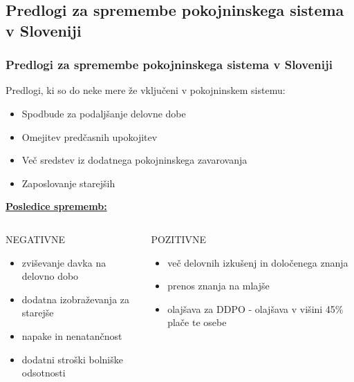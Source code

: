 \documentclass[10pt]{beamer}
\begin{document}
\begin{frame}
\subsection[Predolgi za spremembe pokojninskega sistema v Sloveniji]{Predlogi za spremembe pokojninskega sistema v Sloveniji}
\frametitle{Predlogi za spremembe pokojninskega sistema v Sloveniji}
Predlogi, ki so do neke mere že vključeni v pokojninskem sistemu:
\begin{itemize}
\item Spodbude za podaljšanje delovne dobe
\item Omejitev predčasnih upokojitev
\item Več sredstev iz dodatnega pokojninskega zavarovanja
\item Zaposlovanje starejših
\end{itemize}

\underline{ \textbf{Posledice sprememb:}}
\begin{columns}[T]
\begin{column}{0.5\textwidth}
\begin{block}{NEGATIVNE}
	\begin{itemize}
	\item zviševanje davka na delovno dobo
	\item dodatna izobraževanja za starejše
	\item napake in nenatančnost
	\item dodatni stroški bolniške odsotnosti
	\end{itemize}
\end{block}
\end{column}
\begin{column}{0.5\textwidth}  
\begin{block}{POZITIVNE}
	\begin{itemize}
	\item več delovnih izkušenj in določenega znanja
	\item prenos znanja na mlajše
	\item olajšava za DDPO - olajšava v višini 45\% plače te osebe
	\end{itemize}
\end{block}
\end{column}
\end{columns}
\end{frame}
\end{document}
